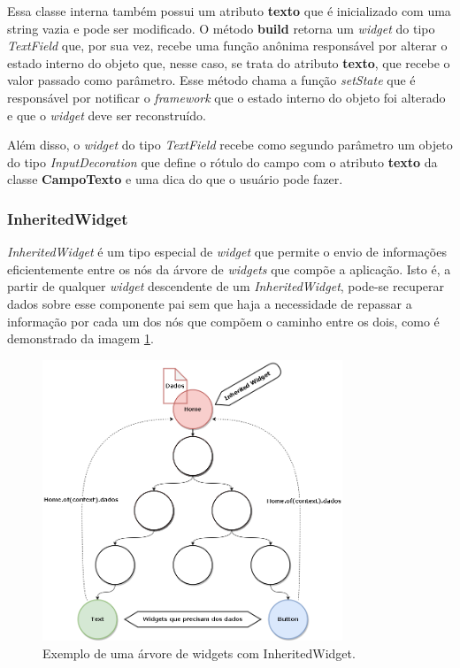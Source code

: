 Essa classe interna também possui um atributo \textbf{texto} que é inicializado com uma string vazia e pode ser modificado. O método \textbf{build} retorna um \textit{widget} do tipo \textit{TextField} que, por sua vez, recebe uma função anônima responsável por alterar o estado interno do objeto que, nesse caso, se trata do atributo \textbf{texto}, que recebe o valor passado como parâmetro. Esse método chama a função \textit{setState} que é responsável por notificar o \textit{framework} que o estado interno do objeto foi alterado e que o \textit{widget} deve ser reconstruído.

Além disso, o \textit{widget} do tipo \textit{TextField} recebe como segundo parâmetro um objeto do tipo \textit{InputDecoration} que define o rótulo do campo com o atributo \textbf{texto} da classe \textbf{CampoTexto} e uma dica do que o usuário pode fazer.

\subsubsection{InheritedWidget}

\textit{InheritedWidget} é um tipo especial de \textit{widget} que permite o envio de informações eficientemente entre os nós da árvore de \textit{widgets} que compõe a aplicação. Isto é, a partir de qualquer \textit{widget} descendente de um \textit{InheritedWidget}, pode-se recuperar dados sobre esse componente pai sem que haja a necessidade de repassar a informação por cada um dos nós que compõem o caminho entre os dois, como é demonstrado da imagem \ref{fig:inherited-widget-diagram}.

\begin{figure}[!ht]
  \centering
  \includegraphics[width=0.8\textwidth]{figuras/cap2/2_2_2_inherited-widget-diagram.png}
  \caption{Exemplo de uma árvore de widgets com InheritedWidget. \protect\cite{Faust2020} \protect\cite{boelens2018}}
  \label{fig:inherited-widget-diagram}
\end{figure}

